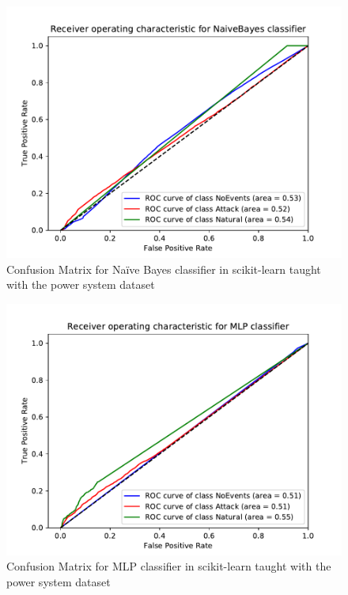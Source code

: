 \begin{figure}[t]
    \centering
    \includegraphics[page=2, width=180mm, trim= 0 50 0 100, clip]{images/results_scikit/NaiveBayes}
    \caption{Confusion Matrix for Naïve Bayes classifier in scikit-learn taught with the power system dataset}
    \label{fig:scikit_NB_CM}
\end{figure}

\begin{figure}[t]
    \centering
    \includegraphics[page=2, width=180mm, trim= 0 50 0 100, clip]{images/results_scikit/MLP}
    \caption{Confusion Matrix for MLP classifier in scikit-learn taught with the power system dataset}
    \label{fig:scikit_MLP_CM}
\end{figure}

